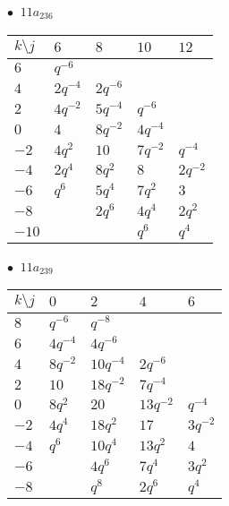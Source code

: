 \begin{minipage}{\linewidth}
$\bullet\ $ $11a_{236}$ \vspace{0.5em} \\
\begin{tabular}{l|llll}
$k \setminus j$ & $6$ & $8$ & $10$ & $12$ \\
\hline
$6$ & $q^{-6}$ &  &  &  \\
$4$ & $2q^{-4}$ & $2q^{-6}$ &  &  \\
$2$ & $4q^{-2}$ & $5q^{-4}$ & $q^{-6}$ &  \\
$0$ & $4$ & $8q^{-2}$ & $4q^{-4}$ &  \\
$-2$ & $4q^{2}$ & $10$ & $7q^{-2}$ & $q^{-4}$ \\
$-4$ & $2q^{4}$ & $8q^{2}$ & $8$ & $2q^{-2}$ \\
$-6$ & $q^{6}$ & $5q^{4}$ & $7q^{2}$ & $3$ \\
$-8$ &  & $2q^{6}$ & $4q^{4}$ & $2q^{2}$ \\
$-10$ &  &  & $q^{6}$ & $q^{4}$ \\
\end{tabular}
\vspace{2em}
\end{minipage}
%
\begin{minipage}{\linewidth}
$\bullet\ $ $11a_{239}$ \vspace{0.5em} \\
\begin{tabular}{l|llll}
$k \setminus j$ & $0$ & $2$ & $4$ & $6$ \\
\hline
$8$ & $q^{-6}$ & $q^{-8}$ &  &  \\
$6$ & $4q^{-4}$ & $4q^{-6}$ &  &  \\
$4$ & $8q^{-2}$ & $10q^{-4}$ & $2q^{-6}$ &  \\
$2$ & $10$ & $18q^{-2}$ & $7q^{-4}$ &  \\
$0$ & $8q^{2}$ & $20$ & $13q^{-2}$ & $q^{-4}$ \\
$-2$ & $4q^{4}$ & $18q^{2}$ & $17$ & $3q^{-2}$ \\
$-4$ & $q^{6}$ & $10q^{4}$ & $13q^{2}$ & $4$ \\
$-6$ &  & $4q^{6}$ & $7q^{4}$ & $3q^{2}$ \\
$-8$ &  & $q^{8}$ & $2q^{6}$ & $q^{4}$ \\
\end{tabular}
\vspace{2em}
\end{minipage}
%
